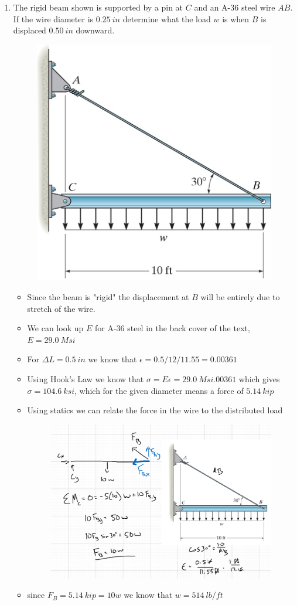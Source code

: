 \documentclass[12pt, oneside]{article}
\let\US\SI
\begin{document}
\begin{enumerate}
	\item %
		The rigid beam shown is supported by a pin at $C$ and an A-36 steel wire $AB$.
		If the wire diameter is $\US{0.25}{in}$ determine what the load $w$ is when $B$ is displaced $\US{0.50}{in}$ downward.
		\begin{figure}[H]
			\centering
			\includegraphics[width=0.5\linewidth]{elastic1}
			\label{fig:elastic1}
		\end{figure}
		\begin{itemize}
			\item Since the beam is "rigid" the displacement at $B$ will be entirely due to stretch of the wire.
			\item We can look up $E$ for A-36 steel in the back cover of the text, $E= 	\US{29.0}{Msi}$
			\item For $\Delta L = \US{0.5}{in}$ we know that $\epsilon = 0.5/12/11.55=0.00361$
			\item Using Hook's Law we know that $\sigma = E\epsilon = \US{29.0}{Msi} .00361$ which gives $\sigma = 	\US{104.6}{ksi}$, which for the given diameter means a force of $ 	\US{5.14}{kip} $
			\item Using statics we can relate the force in the wire to the distributed load
			\begin{figure}[H]
				\centering
				\includegraphics[width=0.6\linewidth]{hw2-6}
			\end{figure}
		\item since $F_B = 	\US{5.14}{kip} = 10w$ we know that $w =	\US{514}{lb/ft} $
		\end{itemize}


\end{enumerate}
\end{document}
